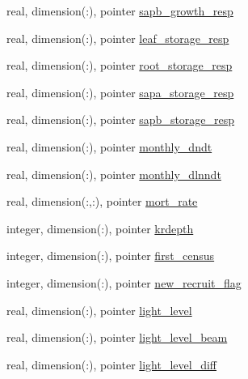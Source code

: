 \begin{DoxyCompactItemize}
\item 
real, dimension(\+:), pointer \hyperlink{structed__state__vars_1_1patchtype_aa5bbdb877824f06d36ebf35d31052689}{sapb\+\_\+growth\+\_\+resp}
\item 
real, dimension(\+:), pointer \hyperlink{structed__state__vars_1_1patchtype_a7a3ee94b62108ad9b56da0b9371eb7b0}{leaf\+\_\+storage\+\_\+resp}
\item 
real, dimension(\+:), pointer \hyperlink{structed__state__vars_1_1patchtype_aefac598db8367c68692ecaf1146a1040}{root\+\_\+storage\+\_\+resp}
\item 
real, dimension(\+:), pointer \hyperlink{structed__state__vars_1_1patchtype_a28b51d950d10f81cf5f2aee7494f5ddd}{sapa\+\_\+storage\+\_\+resp}
\item 
real, dimension(\+:), pointer \hyperlink{structed__state__vars_1_1patchtype_a4c9b24a63239545b90418a503c3ce7b2}{sapb\+\_\+storage\+\_\+resp}
\item 
real, dimension(\+:), pointer \hyperlink{structed__state__vars_1_1patchtype_aedf149a69baf0d28314b71ee73f0f91d}{monthly\+\_\+dndt}
\item 
real, dimension(\+:), pointer \hyperlink{structed__state__vars_1_1patchtype_ac668af2ad319981ce4b394c133589221}{monthly\+\_\+dlnndt}
\item 
real, dimension(\+:,\+:), pointer \hyperlink{structed__state__vars_1_1patchtype_a1cd034b33ffecd03f7043899e7f489d7}{mort\+\_\+rate}
\item 
integer, dimension(\+:), pointer \hyperlink{structed__state__vars_1_1patchtype_af352dbcaf2d6fc32ff8b47119e8510f1}{krdepth}
\item 
integer, dimension(\+:), pointer \hyperlink{structed__state__vars_1_1patchtype_a3195f74e6523938d6df9036ef4569803}{first\+\_\+census}
\item 
integer, dimension(\+:), pointer \hyperlink{structed__state__vars_1_1patchtype_ab7f011c4ea85c061d6d24ca6b810fc1a}{new\+\_\+recruit\+\_\+flag}
\item 
real, dimension(\+:), pointer \hyperlink{structed__state__vars_1_1patchtype_a6f2cb0bf120f000f9c2cf5549e778c7d}{light\+\_\+level}
\item 
real, dimension(\+:), pointer \hyperlink{structed__state__vars_1_1patchtype_af558885d5e1e86adc21fdb873e3f424b}{light\+\_\+level\+\_\+beam}
\item 
real, dimension(\+:), pointer \hyperlink{structed__state__vars_1_1patchtype_a3333fc5db1aaa2d551fbdcb3587f948b}{light\+\_\+level\+\_\+diff}
\item 

\end{DoxyCompactItemize}
